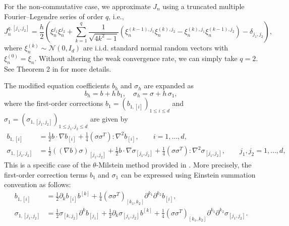 \documentclass[12pt,a4paper,reqno]{amsart}
\numberwithin{equation}{section}
\begin{document}
For the non-commutative case, we approximate $J_n$ using a truncated multiple Fourier--Legendre series of order $q$, i.e., 
\begin{equation*}
    J_n^{q,[j_1,j_2]} = \frac{h}{2}\left(\xi^{j_1}_n\xi_n^{j_2} + \sum_{k=1}^q\frac{1}{\sqrt{4k^2 -1}}(\xi^{(k-1),j_1}_n\xi_n^{(k),j_2} - \xi^{(k),j_1}_n\xi_n^{(k-1),j_2}) - \delta_{j_1,j_2}\right),
\end{equation*}
where $\xi_n^{(k)}\sim \mathcal{N}(0,I_d)$ are i.i.d. standard normal random vectors with $\xi_n^{(0)} = \xi_n$. Without altering the weak convergence rate, we can simply take $q = 2$. See Theorem 2 in \cite{Kuz20} for more details.

The modified equation coefficients $b_{h}$ and $\sigma_{h}$ are expanded as 
\begin{equation*}
	b_h = b + h\,b_1, \quad \sigma_h = \sigma + h\,\sigma_1,
\end{equation*}
where the first-order corrections $b_1 = (b_{1,[i]})_{1\leq i\leq d}$ and $\sigma_1 = (\sigma_{1,[j_1,j_2]})_{1\leq j_1,j_2\leq d}$ are given by
\begin{equation}\label{modified equation}
    \begin{aligned}
    b_{1,[i]} &= \frac{1}{2}b\cdot \nabla b_{[i]} + \frac{1}{4} (\sigma\sigma^T):\nabla^2 b_{[i]},\qquad i=1,\dots,d,\\
    \sigma_{1,[j_1,j_2]} &= \frac{1}{2} \left((\nabla b)\sigma\right)_{[j_1,j_2]} + \frac{1}{2}b\cdot \nabla \sigma_{[j_1,j_2]} + \frac{1}{4}(\sigma\sigma^T): \nabla^2 \sigma_{[j_1,j_2]},\qquad j_1,j_2=1,\dots,d,
    \end{aligned}   
\end{equation}
This is a specific case of the $\theta$-Milstein method provided in \cite{ACV12}.
More precisely, the first-order correction terms $b_1$ and $\sigma_1$ can be expressed using Einstein summation convention as follows:
 \begin{equation*}
    \begin{aligned}
        b_{1,[i]} &= \frac{1}{2}\partial_{k}b_{[i]}b^{[k]} + \frac{1}{4}(\sigma\sigma^T)_{[k_1,k_2]}\partial^{k_1}\partial^{k_2}b_{[i]},\\
        \sigma_{1,[j_1,j_2]} &= \frac{1}{2}\sigma_{[k,j_2]}\partial^k b_{[j_1]}  +\frac{1}{2} \partial_k\sigma_{[j_1,j_2]}b^{[k]} +\frac{1}{4}(\sigma\sigma^T)_{[k_1,k_2]}\partial^{k_1}\partial^{k_2}\sigma_{[j_1,j_2]}.
\end{aligned}     
 \end{equation*} 
\end{document}
